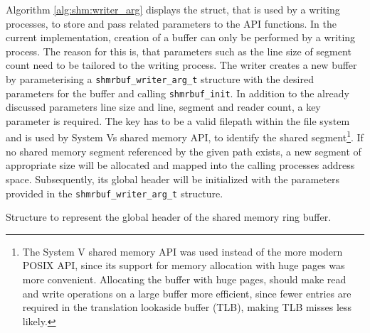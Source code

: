 Algorithm \ref{alg:shm:writer_arg} displays the struct, that is used by a writing processes, to store and pass related parameters to the API functions.
In the current implementation, creation of a buffer can only be performed by a writing process. The reason for this is, that parameters such as the line
size of segment count need to be tailored to the writing process. The writer creates a new buffer by parameterising a \texttt{shmrbuf\_writer\_arg\_t} structure with
the desired parameters for the buffer and calling \texttt{shmrbuf\_init}. In addition to the already discussed parameters line size and line, segment and reader count, 
a key parameter is required. The key has to be a valid filepath within the file system and is used by System Vs shared memory API, to identify the shared segment\footnote{The System V shared memory API \cite{systemvshm} was used instead of the more modern POSIX API, since its support for memory allocation with huge pages was more convenient. Allocating the buffer with huge pages, should make read and write operations on a large buffer more efficient, since fewer entries are required in the translation lookaside buffer (TLB), making TLB misses less likely.}.  
If no shared memory segment referenced by the given path exists, a new segment of appropriate size will be allocated and mapped into the calling processes address space. Subsequently, its global header will 
be initialized with the parameters provided in the \texttt{shmrbuf\_writer\_arg\_t} structure.  

\begin{algorithm}[h!]
    
    \label{alg:shm:global_hdr}
    \caption[Shared Memory Ringbuffer: Global Header]{Structure to represent the global header of the shared memory ring buffer.}
\end{algorithm}

